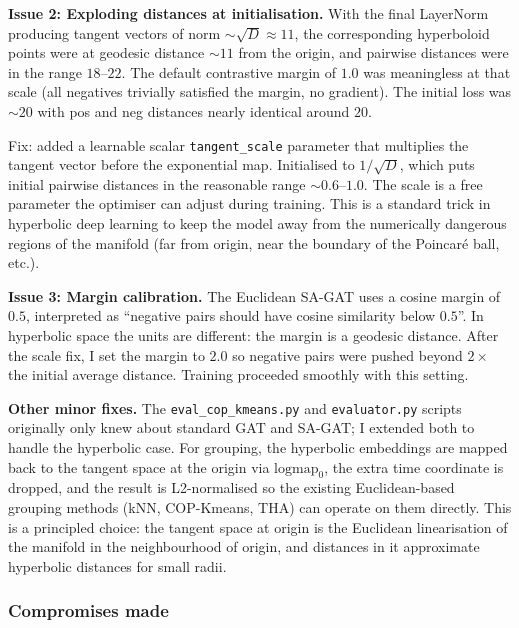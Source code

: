 \textbf{Issue 2: Exploding distances at initialisation.} With the final LayerNorm producing tangent vectors of norm $\sim \sqrt{D} \approx 11$, the corresponding hyperboloid points were at geodesic distance $\sim 11$ from the origin, and pairwise distances were in the range $18$--$22$. The default contrastive margin of $1.0$ was meaningless at that scale (all negatives trivially satisfied the margin, no gradient). The initial loss was $\sim 20$ with pos and neg distances nearly identical around $20$.

Fix: added a learnable scalar \texttt{tangent\_scale} parameter that multiplies the tangent vector before the exponential map. Initialised to $1/\sqrt{D}$, which puts initial pairwise distances in the reasonable range $\sim 0.6$--$1.0$. The scale is a free parameter the optimiser can adjust during training. This is a standard trick in hyperbolic deep learning to keep the model away from the numerically dangerous regions of the manifold (far from origin, near the boundary of the Poincar\'e ball, etc.).

\textbf{Issue 3: Margin calibration.} The Euclidean SA-GAT uses a cosine margin of $0.5$, interpreted as ``negative pairs should have cosine similarity below $0.5$''. In hyperbolic space the units are different: the margin is a geodesic distance. After the scale fix, I set the margin to $2.0$ so negative pairs were pushed beyond $2\times$ the initial average distance. Training proceeded smoothly with this setting.

\textbf{Other minor fixes.} The \texttt{eval\_cop\_kmeans.py} and \texttt{evaluator.py} scripts originally only knew about standard GAT and SA-GAT; I extended both to handle the hyperbolic case. For grouping, the hyperbolic embeddings are mapped back to the tangent space at the origin via $\text{logmap}_0$, the extra time coordinate is dropped, and the result is L2-normalised so the existing Euclidean-based grouping methods (kNN, COP-Kmeans, THA) can operate on them directly. This is a principled choice: the tangent space at origin is the Euclidean linearisation of the manifold in the neighbourhood of origin, and distances in it approximate hyperbolic distances for small radii.

\subsubsection{Compromises made}

